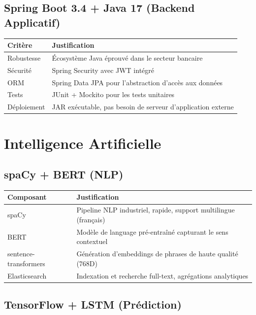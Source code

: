 \documentclass[12pt,a4paper]{report}
\begin{document}
\subsection{Spring Boot 3.4 + Java 17 (Backend Applicatif)}

\begin{table}[H]
\centering
\begin{tabularx}{\textwidth}{|l|X|}
\hline
\textbf{Critère} & \textbf{Justification} \\
\hline
Robustesse & Écosystème Java éprouvé dans le secteur bancaire \\
\hline
Sécurité & Spring Security avec JWT intégré \\
\hline
ORM & Spring Data JPA pour l'abstraction d'accès aux données \\
\hline
Tests & JUnit + Mockito pour les tests unitaires \\
\hline
Déploiement & JAR exécutable, pas besoin de serveur d'application externe \\
\hline
\end{tabularx}
\end{table}

\section{Intelligence Artificielle}

\subsection{spaCy + BERT (NLP)}

\begin{table}[H]
\centering
\begin{tabularx}{\textwidth}{|l|X|}
\hline
\textbf{Composant} & \textbf{Justification} \\
\hline
spaCy & Pipeline NLP industriel, rapide, support multilingue (français) \\
\hline
BERT & Modèle de language pré-entraîné capturant le sens contextuel \\
\hline
sentence-transformers & Génération d'embeddings de phrases de haute qualité (768D) \\
\hline
Elasticsearch & Indexation et recherche full-text, agrégations analytiques \\
\hline
\end{tabularx}
\end{table}

\subsection{TensorFlow + LSTM (Prédiction)}
\end{document}

